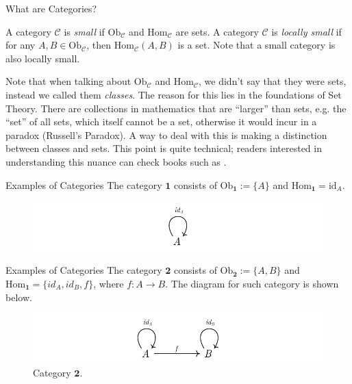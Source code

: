 \documentclass[aspectratio=169,xcolor=dvipsnames,10pt]{beamer}
\theoremstyle{definition}
\begin{document}
\begin{frame}[fragile]{What are Categories?}

    \begin{definition}
        A category $\mathcal C$ is \textit{small} if $\text{Ob}_\mathcal C$ and
        $\text{Hom}_\mathcal C$ are sets. A category $\mathcal C$ is \textit{locally small} if
        for any $A, B \in \text{Ob}_\mathcal C$, then
        $\text{Hom}_\mathcal C(A,B)$ is a set. Note that a small category is also locally small.
    \end{definition}

    Note that when talking about $\text{Ob}_\mathcal C$ and $\text{Hom}_\mathcal C$, we didn't say
    that they were sets, instead we called them \textit{classes}. The reason for
    this lies in the foundations of Set Theory. There are collections in mathematics
    that are ``larger'' than sets, e.g. the ``set'' of all sets, which itself cannot be a set,
    otherwise it would incur in a paradox (Russell's Paradox). A way to deal
    with this is making a distinction between classes and sets.
    This point is quite technical; readers interested in understanding this nuance can check books such as \citet{borceux1994handbook}.
\end{frame}

\begin{frame}[fragile]{Examples of Categories}
    The category $\mathbf{1}$ consists of $\text{Ob}_{\mathbf{1}} := \{A\}$ and $\mathrm{Hom}_{\mathbf{1}} = \mathrm{id}_A$.

	\begin{figure}[H]
		\begin{center}
			\includegraphics[width=1.0\textwidth]{./figs/1Cat.pdf}
		\end{center}
	\end{figure}

\end{frame}

\begin{frame}[fragile]{Examples of Categories}
	The category $\bm 2$ consists of $\text{Ob}_{\bm 2} := \{A, B\}$ and $\text{Hom}_{\bm 1} = \{id_A, id_B, f\}$,
	where $f:A \to B$.
	The diagram for such category is shown below.
	\begin{figure}[H]
		\begin{center}
			\includegraphics[width=1.00\textwidth]{./figs/2Cat.pdf}
		\end{center}
		\caption{Category $\bm 2$.}
		\label{fig:2Cat}
	\end{figure}
\end{frame}
\end{document}
